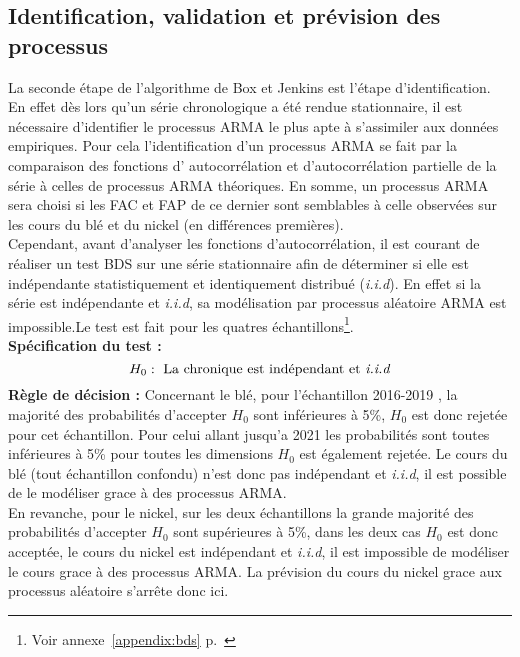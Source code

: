 \subsection{Identification, validation et prévision des processus}
La seconde étape de l'algorithme de Box et Jenkins est l'étape d'identification. En effet dès lors qu'un série chronologique a été rendue stationnaire, il est
nécessaire d'identifier le processus ARMA le plus apte à s'assimiler aux données empiriques. 
Pour cela l'identification d'un processus ARMA se fait par la comparaison des fonctions d' autocorrélation et d'autocorrélation partielle de la série à celles de processus 
ARMA théoriques. En somme, un processus ARMA sera choisi si les FAC et FAP de ce dernier sont semblables à celle observées sur les cours du blé et du nickel (en 
différences premières).\\[11pt]
Cependant, avant d'analyser les fonctions d'autocorrélation, il est courant de réaliser un test BDS sur une série stationnaire afin de déterminer si elle est 
indépendante statistiquement et identiquement distribué (\textit{i.i.d}). En effet si la série est indépendante et \textit{i.i.d}, sa modélisation par processus aléatoire 
ARMA est impossible.Le test est fait pour les quatres échantillons\footnote{Voir annexe~\ref{appendix:bds} p.~\pageref{appendix:bds}}.\\
\textbf{Spécification du test :} 
\begin{equation*}
    H_{0} : \text{ La chronique est indépendant et \textit{i.i.d}}
\end{equation*}
\textbf{Règle de décision :} Concernant le blé, pour l'échantillon 2016-2019 , la majorité des probabilités d'accepter $H_{0}$ sont inférieures à 5\%, $H_{0}$ est donc 
rejetée pour cet échantillon. Pour celui allant jusqu'a 2021 les probabilités sont toutes inférieures à 5\% pour toutes les dimensions $H_{0}$ est également rejetée.
Le cours du blé (tout échantillon confondu) n'est donc pas indépendant et \textit{i.i.d}, il est possible de le modéliser grace à des processus ARMA.\\[11pt]
En revanche, pour le nickel, sur les deux échantillons la grande majorité des probabilités d'accepter $H_{0}$ sont supérieures à 5\%, dans les deux cas $H_{0}$ est donc 
acceptée, le cours du nickel est indépendant et \textit{i.i.d}, il est impossible de modéliser le cours grace à des processus ARMA. La prévision du cours du nickel grace aux processus aléatoire s'arrête donc ici.

